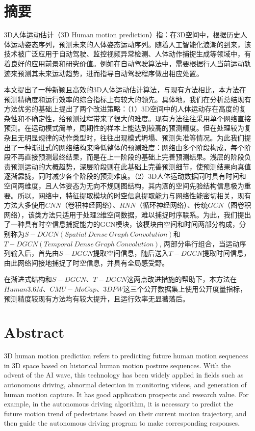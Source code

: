 \chapter{摘\texorpdfstring{\quad}{}要}
	3D人体运动估计（3D Human motion prediction）指：在3D空间中，根据历史人体运动姿态序列，预测未来的人体姿态运动序列。随着人工智能化浪潮的到来，该技术被广泛应用于自动驾驶、监控视频异常检测、人体动作捕捉生成等领域中，有着良好的应用前景和研究价值。例如在自动驾驶算法中，需要根据行人当前运动轨迹来预测其未来运动趋势，进而指导自动驾驶程序做出相应处置。
	
	本文提出了一种新颖且高效的3D人体运动估计算法，与现有方法相比，本方法在预测精确度和运行效率的综合指标上有较大的领先。具体地，我们在分析总结现有方法优劣的基础上提出了两个改进策略：（1）3D空间中的人体运动存在高度的复杂性和不确定性，给预测过程带来了很大的难度。现有方法往往采用单个网络直接预测。在运动模式简单，周期性的样本上能达到较高的预测精度。但在处理较为复杂且无明显规律的动作类型时，往往出现模式坍塌、预测失准等情况。为此我们提出了一种渐进式的网络结构来降低整体的预测难度：网络由多个阶段构成，每个阶段不再直接预测最终结果，而是在上一阶段的基础上完善预测结果。浅层的阶段负责预测运动的大概趋势，深层阶段则在此基础上完善预测细节，使预测结果向真值逐渐靠拢，同时减少各个阶段的预测难度。（2）3D人体运动数据同时具有时间和空间两维度，且人体姿态为无向不规则图结构，其内涵的空间先验结构信息极为重要。所以，网络中，特征提取模块的时空信息提取能力与网络性能密切相关，现有方法大多使用$CNN$（卷积神经网络）、$RNN$（循环神经网络）、传统$GCN$（图卷积网络），该类方法只适用于处理2维空间数据，难以捕捉时序联系。为此，我们提出了一种具有时空信息捕捉能力的GCN模块，该模块由空间和时间两部分构成，分别称为$S-DGCN(Spatial \ Dense \ Graph \ Convolution)$和$T-DGCN(Temporal \ Dense \ Graph \ Convolution)$, 两部分串行组合，当运动序列输入后，首先由$S-DGCN$提取空间信息，随后送入$T-DGCN$提取时间信息，由此网络间接地捕捉了时空信息，并具有全局感受野。
	
	在渐进式结构和$S-DGCN$、$T-DGCN$这两点改进措施的帮助下，本方法在$Human3.6M$、$CMU-MoCap$、$3DPW$这三个公开数据集上使用公开度量指标，预测精度较现有方法均有较大提升，且运行效率无显著落后。



\chapter{Abstract}
3D human motion prediction refers to predicting future human motion sequences in 3D space based on historical human motion posture sequences. With the advent of the AI wave, this technology has been widely applied in fields such as autonomous driving, abnormal detection in monitoring videos, and generation of human motion capture. It has good application prospects and research value. For example, in the autonomous driving algorithm, it is necessary to predict the future motion trend of pedestrians based on their current motion trajectory, and then guide the autonomous driving program to make corresponding responses.

